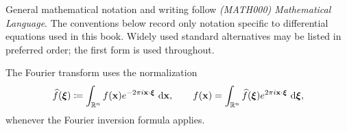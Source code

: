 
General mathematical notation and writing follow \textit{(MATH000) Mathematical Language}. The conventions below record only notation specific to differential equations used in this book. Widely used standard alternatives may be listed in preferred order; the first form is used throughout.


The Fourier transform uses the normalization
\[
\widehat f(\boldsymbol{\xi})\coloneqq
\int_{\mathbb{R}^n} f(\mathbf{x})e^{-2\pi i\mathbf{x}\cdot\boldsymbol{\xi}}\,\mathop{}\!\mathrm{d}\mathbf{x},
\qquad
f(\mathbf{x})=
\int_{\mathbb{R}^n}\widehat f(\boldsymbol{\xi})e^{2\pi i\mathbf{x}\cdot\boldsymbol{\xi}}\,\mathop{}\!\mathrm{d}\boldsymbol{\xi},
\]
whenever the Fourier inversion formula applies.

